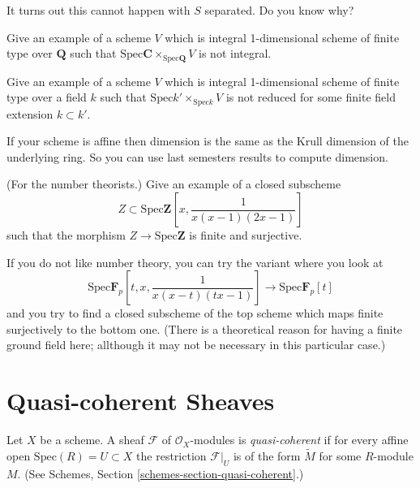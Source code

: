 \begin{remark}
It turns out this cannot happen with $S$ separated. Do you know why?
\end{remark}

\begin{exercise}
\label{exercise-not-geometrically-integral}
Give an example of a scheme
$V$ which is integral 1-dimensional scheme of finite type
over ${\mathbf Q}$ such that
$\text{Spec}{\mathbf C} \times_{\text{Spec}{\mathbf Q}} V$
is not integral.
\end{exercise}

\begin{exercise}
\label{exercise-not-geometrically-reduced}
Give an example of a scheme
$V$ which is integral 1-dimensional scheme of finite type
over a field $k$ such that $\text{Spec} k' \times_{\text{Spec}{k}} V$
is not reduced for some finite field extension $k \subset k'$.
\end{exercise}

\begin{remark}
If your scheme is affine then dimension is the
same as the Krull dimension of the underlying ring. So you can
use last semesters results to compute dimension.
\end{remark}

\begin{exercise}
\label{exercise-for-number-theorists}
(For the number theorists.) Give an example of a closed subscheme
$$
Z \subset \text{Spec} {\mathbf Z}[x, \frac{1 }{ x(x-1)(2x-1)}]
$$
such that the morphism $Z \to \text{Spec} {\mathbf Z}$ is finite
and surjective.
\end{exercise}

\begin{remark}
If you do not like number theory, you can try the 
variant where you look at
$$
\text{Spec} {\mathbf F}_p[t, x, \frac{1 }{ x(x-t)(tx-1)}]  \longrightarrow
\text{Spec} {\mathbf F}_p[t]
$$
and you try to find a closed subscheme of the top scheme
which maps finite surjectively to the bottom one. (There is a
theoretical reason for having a finite ground field here; allthough
it may not be necessary in this particular case.)
\end{remark}


\section{Quasi-coherent Sheaves}
\label{section-quasi-coherent}

\begin{definition}
Let $X$ be a scheme.
A sheaf $\mathcal{F}$ of $\mathcal{O}_X$-modules is {\it quasi-coherent}
if for every affine open $\text{Spec}(R) = U \subset X$ the restriction
$\mathcal{F}|_U$ is of the form $\widetilde M$ for some $R$-module
$M$. (See Schemes, Section \ref{schemes-section-quasi-coherent}.)
\end{definition}

